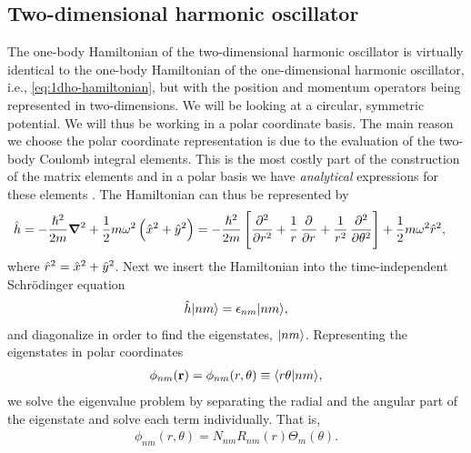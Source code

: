     \subsection{Two-dimensional harmonic oscillator}
        The one-body Hamiltonian of the two-dimensional harmonic oscillator is
        virtually identical to the one-body Hamiltonian of the one-dimensional
        harmonic oscillator, i.e., \autoref{eq:1dho-hamiltonian}, but with the
        position and momentum operators being represented in two-dimensions. We
        will be looking at a circular, symmetric potential. We will thus be
        working in a polar coordinate basis. The main reason we choose
        the polar coordinate representation is due to the evaluation of the
        two-body Coulomb integral elements. This is the most costly part of the
        construction of the matrix elements and in a polar basis we have
        \emph{analytical} expressions for these elements
        \cite{anisimovas1998energy}.  The Hamiltonian can thus be represented by
        \begin{align}
            \onehamil &= -\frac{\hslash^2}{2m}\vfg{\nabla}^2
            + \half m\omega^2\para{\position^2 + \position[y]^2}
            = -\frac{\hslash^2}{2m}\brak{
                \dpd[2]{}{r}
                + \frac{1}{r}\dpd[]{}{r}
                + \frac{1}{r^2}\dpd[2]{}{\theta}
            }
            + \half m \omega^2 \position[r]^2,
        \end{align}
        where $\position[r]^2 = \position^2 + \position[y]^2$. Next we insert
        the Hamiltonian into the time-independent Schrödinger equation
        \begin{align}
            \onehamil\ket{nm} = \epsilon_{nm}\ket{nm},
        \end{align}
        and diagonalize in order to find the eigenstates, $\ket{nm}$.
        Representing the eigenstates in polar coordinates
        \begin{align}
            \phi_{nm}(\vf{r}) = \phi_{nm}(r, \theta)
            \equiv \braket{r\theta}{nm},
        \end{align}
        we solve the eigenvalue problem by separating the radial and the angular
        part of the eigenstate and solve each term individually. That is,
        \begin{align}
            \phi_{nm}(r, \theta) = N_{nm}R_{nm}(r)\Theta_{m}(\theta).
        \end{align}
